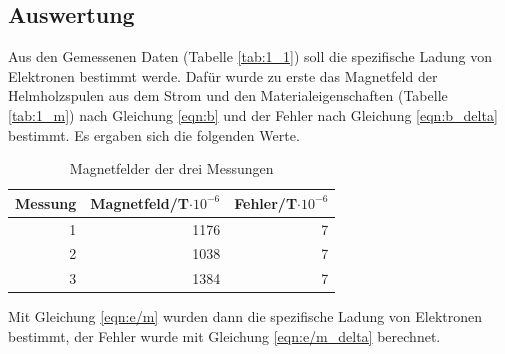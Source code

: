 \documentclass[12pt,a4paper]{article}
\begin{document}
\subsection{Auswertung}

Aus den Gemessenen Daten (Tabelle \ref{tab:1_1}) soll die spezifische Ladung von Elektronen bestimmt werde. Dafür wurde zu erste das Magnetfeld der Helmholzspulen aus dem Strom und den Materialeigenschaften (Tabelle \ref{tab:1_m}) nach Gleichung \ref{eqn:b} und der Fehler nach Gleichung \ref{eqn:b_delta}  bestimmt. Es ergaben sich die folgenden Werte.

\begin{table}[H]
\caption{Magnetfelder der drei Messungen}
\begin{center}
\begin{tabular}{|r|r|r|}
\hline
\multicolumn{1}{|l|}{Messung} & \multicolumn{1}{l|}{Magnetfeld/T$\cdot 10^{-6}$} & \multicolumn{1}{l|}{Fehler/T$\cdot 10^{-6}$} \\ \hline
1 & 1176 & 7 \\ \hline
2 & 1038 & 7 \\ \hline
3 & 1384 & 7 \\ \hline
\end{tabular}
\end{center}
\label{tab:aus_b}
\end{table}

Mit Gleichung \ref{eqn:e/m} wurden dann die spezifische Ladung von Elektronen bestimmt, der Fehler wurde mit Gleichung \ref{eqn:e/m_delta} berechnet.
\end{document}
